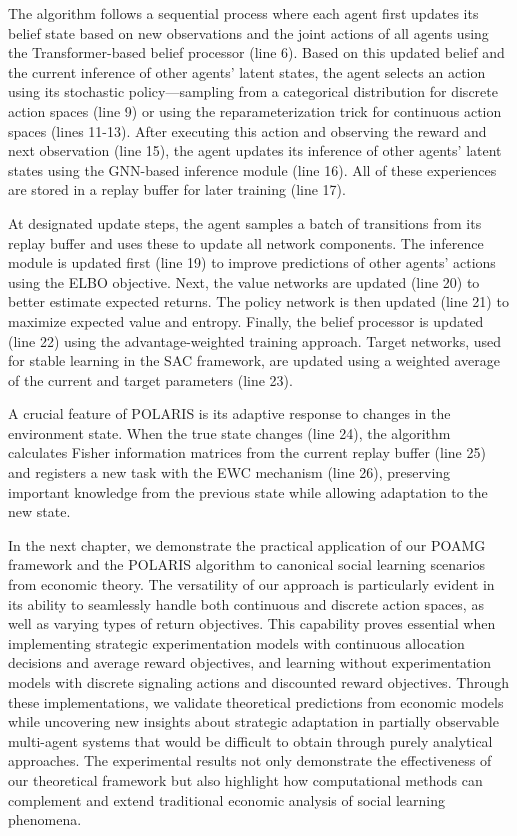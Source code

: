 \documentclass[a4paper,12pt]{report}
\begin{document}
The algorithm follows a sequential process where each agent first updates its belief state based on new observations and the joint actions of all agents using the Transformer-based belief processor (line 6). Based on this updated belief and the current inference of other agents' latent states, the agent selects an action using its stochastic policy—sampling from a categorical distribution for discrete action spaces (line 9) or using the reparameterization trick for continuous action spaces (lines 11-13). After executing this action and observing the reward and next observation (line 15), the agent updates its inference of other agents' latent states using the GNN-based inference module (line 16). All of these experiences are stored in a replay buffer for later training (line 17).

At designated update steps, the agent samples a batch of transitions from its replay buffer and uses these to update all network components. The inference module is updated first (line 19) to improve predictions of other agents' actions using the ELBO objective. Next, the value networks are updated (line 20) to better estimate expected returns. The policy network is then updated (line 21) to maximize expected value and entropy. Finally, the belief processor is updated (line 22) using the advantage-weighted training approach. Target networks, used for stable learning in the SAC framework, are updated using a weighted average of the current and target parameters (line 23).

A crucial feature of POLARIS is its adaptive response to changes in the environment state. When the true state changes (line 24), the algorithm calculates Fisher information matrices from the current replay buffer (line 25) and registers a new task with the EWC mechanism (line 26), preserving important knowledge from the previous state while allowing adaptation to the new state.

In the next chapter, we demonstrate the practical application of our POAMG framework and the POLARIS algorithm to canonical social learning scenarios from economic theory. The versatility of our approach is particularly evident in its ability to seamlessly handle both continuous and discrete action spaces, as well as varying types of return objectives. This capability proves essential when implementing strategic experimentation models with continuous allocation decisions and average reward objectives, and learning without experimentation models with discrete signaling actions and discounted reward objectives. Through these implementations, we validate theoretical predictions from economic models while uncovering new insights about strategic adaptation in partially observable multi-agent systems that would be difficult to obtain through purely analytical approaches. The experimental results not only demonstrate the effectiveness of our theoretical framework but also highlight how computational methods can complement and extend traditional economic analysis of social learning phenomena.
\end{document}
